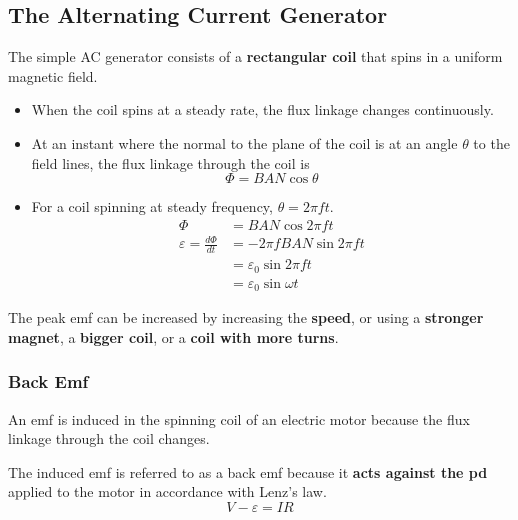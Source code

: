\subsection{The Alternating Current Generator}

The simple AC generator consists of a \textbf{rectangular coil} that spins in a uniform magnetic field.
\begin{itemize}
    \item When the coil spins at a steady rate, the flux linkage changes continuously.
    \item At an instant where the normal to the plane of the coil is at an angle $\theta$ to the field lines, the flux linkage through the coil is
        $$\Phi=BAN\cos\theta$$
    \item For a coil spinning at steady frequency, $\theta=2\pi ft$.
        \begin{align*}
            \Phi&=BAN\cos 2\pi ft\\
            \varepsilon=\frac{d\Phi}{dt}&=-2\pi fBAN\sin 2\pi ft\\
                                        &=\varepsilon_0\sin 2\pi ft\\
                                        &=\varepsilon_0\sin\omega t
        \end{align*}
\end{itemize}

The peak emf can be increased by increasing the \textbf{speed}, or using a \textbf{stronger magnet}, a \textbf{bigger coil}, or a \textbf{coil with more turns}.

\subsubsection*{Back Emf}

An emf is induced in the spinning coil of an electric motor because the flux linkage through the coil changes.

The induced emf is referred to as a back emf because it \textbf{acts against the pd} applied to the motor in accordance with Lenz's law.
$$V-\varepsilon=IR$$
